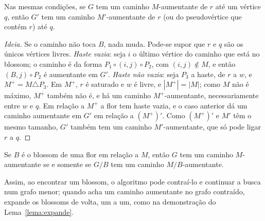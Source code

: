 \begin{lema}\label{lema:contrai}
Nas mesmas condições, se $G$ tem um caminho $M$-aumentante de $r$ até um vértice $q$, então $G'$ tem um caminho $M'$-aumentante de $r$ (ou do pseudovértice que contém $r$) até $q$.
\end{lema}
\begin{proof}[Ideia]
Se o caminho não toca $B$, nada muda. Pode-se supor que $r$ e $q$ são os únicos vértices livres. \emph{Haste vazia}: seja $i$ o último vértice do caminho que está no blossom; o caminho é da forma $P_1\circ(i,j)\circ P_2$, com $(i,j)\notin M$, e então $(B,j)\circ P_2$ é aumentante em $G'$. \emph{Haste não vazia}: seja $P_3$ a haste, de $r$ a $w$, e $M^+=M\triangle P_3$. Em $M^+$, $r$ é saturado e $w$ é livre, e $|M^+|=|M|$; como $M$ não é máximo, $M^+$ também não é, e há um caminho $M^+$-aumentante, necessariamente entre $w$ e $q$. Em relação a $M^+$ a flor tem haste vazia, e o caso anterior dá um caminho aumentante em $G'$ em relação a $(M^+)'$. Como $(M^+)'$ e $M'$ têm o mesmo tamanho, $G'$ também tem um caminho $M'$-aumentante, que só pode ligar $r$ a $q$.
\end{proof}

\begin{teo}[Edmonds]\label{teo:edmonds}
Se $B$ é o blossom de uma flor em relação a $M$, então $G$ tem um caminho $M$-aumentante se e somente se $G/B$ tem um caminho $M/B$-aumentante.
\end{teo}
Assim, ao encontrar um blossom, o algoritmo pode contraí-lo e continuar a busca num grafo menor; quando acha um caminho aumentante no grafo contraído, expande os blossoms de volta, um a um, como na demonstração do Lema~\ref{lema:expande}.

